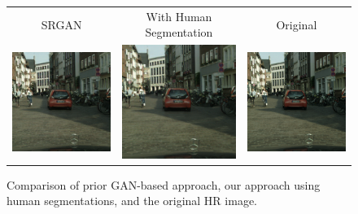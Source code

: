 \documentclass[10pt,twocolumn,letterpaper]{article}
\begin{document}
\begin{figure}[ht!]
    \begin{center}
        \begin{tabular}{ccc}
            SRGAN & With Human Segmentation & Original \\
            \includegraphics[trim=0 0 0 0, clip,
                width=2.2in]{images/comp_srgan_none.png} &
            \includegraphics[trim=0 0 0 0, clip,
                width=2.2in]{images/comp_srgan_human.png} &
            \includegraphics[trim=0 0 0 0, clip,
                width=2.2in]{images/comp_gt.png}
        \end{tabular}
    \end{center}
    \caption{Comparison of prior GAN-based approach, our approach using human
    segmentations, and the original HR image.}
    \label{fig:methodComparison}
\end{figure}
\end{document}
